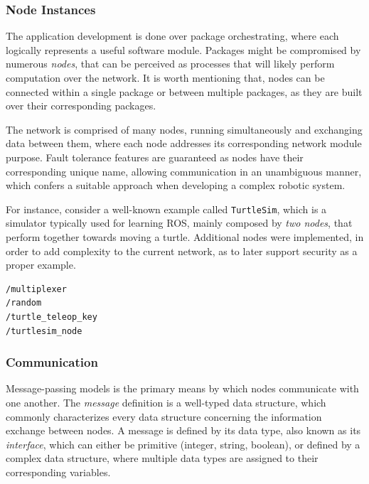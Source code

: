 \subsubsection{Node Instances}

The application development is done over package orchestrating, where each logically represents a useful software module. Packages might be compromised by numerous \textit{nodes}, that can be perceived as processes that will likely perform computation over the network. It is worth mentioning that, nodes can be connected within a single package or between multiple packages, as they are built over their corresponding packages.

The network is comprised of many nodes, running simultaneously and exchanging data between them, where each node addresses its corresponding network module purpose. Fault tolerance features are guaranteed as nodes have their corresponding unique name, allowing communication in an unambiguous manner, which confers a suitable approach when developing a complex robotic system.

For instance, consider a well-known example called \texttt{TurtleSim}, which is a simulator typically used for learning ROS, mainly composed by \textit{two nodes}, that perform together towards moving a turtle. Additional nodes were implemented, in order to add complexity to the current network, as to later support security as a proper example. %

\begin{lstlisting}[title={The \texttt{TurtleSim} node list.}]
/multiplexer
/random
/turtle_teleop_key
/turtlesim_node
\end{lstlisting}

\subsubsection{Communication}

Message-passing models is the primary means by which nodes communicate with one another. The \textit{message} definition is a well-typed data structure, which commonly characterizes every data structure concerning the information exchange between nodes. A message is defined by its data type, also known as its \textit{interface}, which can either be primitive (integer, string, boolean), or defined by a complex data structure, where multiple data types are assigned to their corresponding variables. 

